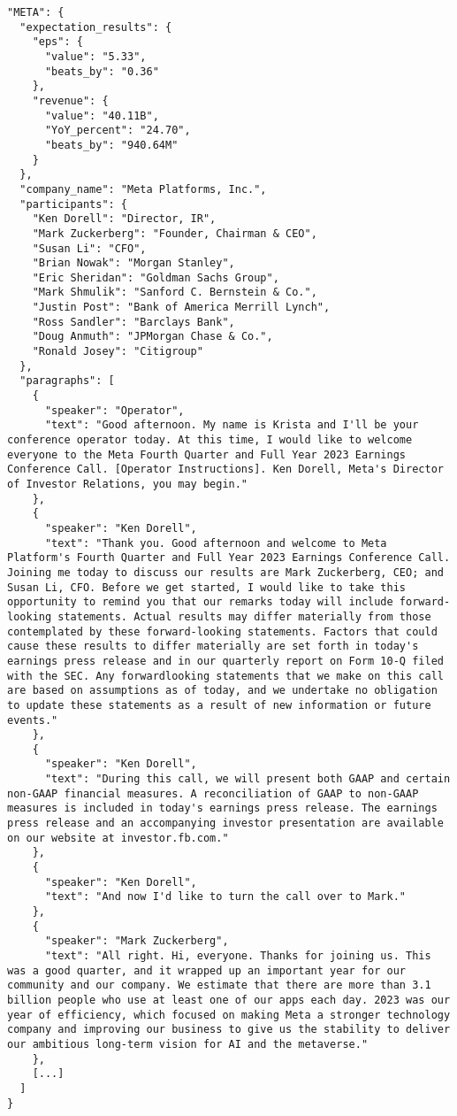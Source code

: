 \documentclass{article}
\begin{document}
\begin{verbatim}
"META": {
  "expectation_results": {
    "eps": {
      "value": "5.33",
      "beats_by": "0.36"
    },
    "revenue": {
      "value": "40.11B",
      "YoY_percent": "24.70",
      "beats_by": "940.64M"
    }
  },
  "company_name": "Meta Platforms, Inc.",
  "participants": {
    "Ken Dorell": "Director, IR",
    "Mark Zuckerberg": "Founder, Chairman & CEO",
    "Susan Li": "CFO",
    "Brian Nowak": "Morgan Stanley",
    "Eric Sheridan": "Goldman Sachs Group",
    "Mark Shmulik": "Sanford C. Bernstein & Co.",
    "Justin Post": "Bank of America Merrill Lynch",
    "Ross Sandler": "Barclays Bank",
    "Doug Anmuth": "JPMorgan Chase & Co.",
    "Ronald Josey": "Citigroup"
  },
  "paragraphs": [
    {
      "speaker": "Operator",
      "text": "Good afternoon. My name is Krista and I'll be your conference operator today. At this time, I would like to welcome everyone to the Meta Fourth Quarter and Full Year 2023 Earnings Conference Call. [Operator Instructions]. Ken Dorell, Meta's Director of Investor Relations, you may begin."
    },
    {
      "speaker": "Ken Dorell",
      "text": "Thank you. Good afternoon and welcome to Meta Platform's Fourth Quarter and Full Year 2023 Earnings Conference Call. Joining me today to discuss our results are Mark Zuckerberg, CEO; and Susan Li, CFO. Before we get started, I would like to take this opportunity to remind you that our remarks today will include forward-looking statements. Actual results may differ materially from those contemplated by these forward-looking statements. Factors that could cause these results to differ materially are set forth in today's earnings press release and in our quarterly report on Form 10-Q filed with the SEC. Any forwardlooking statements that we make on this call are based on assumptions as of today, and we undertake no obligation to update these statements as a result of new information or future events."
    },
    {
      "speaker": "Ken Dorell",
      "text": "During this call, we will present both GAAP and certain non-GAAP financial measures. A reconciliation of GAAP to non-GAAP measures is included in today's earnings press release. The earnings press release and an accompanying investor presentation are available on our website at investor.fb.com."
    },
    {
      "speaker": "Ken Dorell",
      "text": "And now I'd like to turn the call over to Mark."
    },
    {
      "speaker": "Mark Zuckerberg",
      "text": "All right. Hi, everyone. Thanks for joining us. This was a good quarter, and it wrapped up an important year for our community and our company. We estimate that there are more than 3.1 billion people who use at least one of our apps each day. 2023 was our year of efficiency, which focused on making Meta a stronger technology company and improving our business to give us the stability to deliver our ambitious long-term vision for AI and the metaverse."
    },
    [...]
  ]
}
\end{verbatim}
\end{document}
